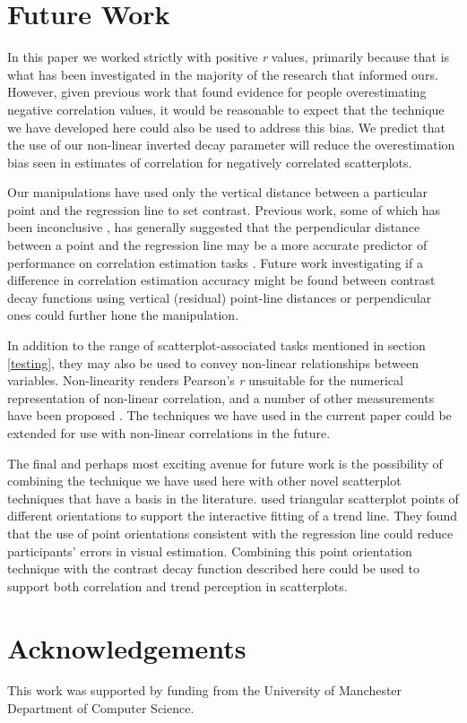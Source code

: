 \documentclass[preprint, 3p,
authoryear]{elsarticle} %
\begin{document}
\hypertarget{future-work}{%
\section{Future Work}\label{future-work}}

In this paper we worked strictly with positive \emph{r} values,
primarily because that is what has been investigated in the majority of
the research that informed ours. However, given previous work
\citep{sher_2017} that found evidence for people overestimating negative
correlation values, it would be reasonable to expect that the technique
we have developed here could also be used to address this bias. We
predict that the use of our non-linear inverted decay parameter will
reduce the overestimation bias seen in estimates of correlation for
negatively correlated scatterplots.

Our manipulations have used only the vertical distance between a
particular point and the regression line to set contrast. Previous work,
some of which has been inconclusive \citep{meyer_1997}, has generally
suggested that the perpendicular distance between a point and the
regression line may be a more accurate predictor of performance on
correlation estimation tasks
\citep{cleveland_1982, yang_2019, rensink_2017}. Future work
investigating if a difference in correlation estimation accuracy might
be found between contrast decay functions using vertical (residual)
point-line distances or perpendicular ones could further hone the
manipulation.

In addition to the range of scatterplot-associated tasks mentioned in
section \ref{testing}, they may also be used to convey non-linear
relationships between variables. Non-linearity renders Pearson's
\emph{r} unsuitable for the numerical representation of non-linear
correlation, and a number of other measurements have been proposed
\citep{laarne_2021}. The techniques we have used in the current paper
could be extended for use with non-linear correlations in the future.

The final and perhaps most exciting avenue for future work is the
possibility of combining the technique we have used here with other
novel scatterplot techniques that have a basis in the literature.
\citet{liu_2021} used triangular scatterplot points of different
orientations to support the interactive fitting of a trend line. They
found that the use of point orientations consistent with the regression
line could reduce participants' errors in visual estimation. Combining
this point orientation technique with the contrast decay function
described here could be used to support both correlation and trend
perception in scatterplots.

\hypertarget{acknowledgements}{%
\section{Acknowledgements}\label{acknowledgements}}

This work was supported by funding from the University of Manchester
Department of Computer Science.

\renewcommand\refname{References}

\end{document}
